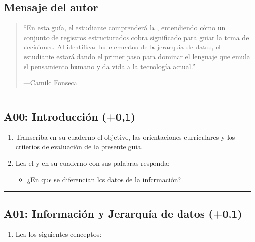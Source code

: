 \documentclass[letterpaper,10pt,spanish]{sphinxmanual}
\begin{document}
\subsection{Mensaje del autor}
\label{\detokenize{1_guias/8logica/G822:mensaje-del-autor}}\begin{quote}

\sphinxAtStartPar
“En esta guía, el estudiante comprenderá la , entendiendo cómo un conjunto de registros estructurados cobra significado para guiar la toma de decisiones. Al identificar los elementos de la jerarquía de datos, el estudiante estará dando el primer paso para dominar el lenguaje que emula el pensamiento humano y da vida a la tecnología actual.”

\begin{flushright}
---Camilo Fonseca
\end{flushright}
\end{quote}


\bigskip\hrule\bigskip



\subsection{A00: Introducción (+0,1)}
\label{\detokenize{1_guias/8logica/G822:a00-introduccion-0-1}}
\sphinxAtStartPar
{}
\begin{enumerate}
%
\item {} 
\sphinxAtStartPar
Transcriba en su cuaderno el objetivo, las orientaciones curriculares y los criterios de evaluación de la presente guía.

\item {} 
\sphinxAtStartPar
Lea el  y en su cuaderno con sus palabras responda:
\begin{itemize}
\item {} 
\sphinxAtStartPar
¿En que se diferencian los datos de la información?

\end{itemize}

\end{enumerate}


\bigskip\hrule\bigskip



\subsection{A01: Información y Jerarquía de datos (+0,1)}
\label{\detokenize{1_guias/8logica/G822:a01-informacion-y-jerarquia-de-datos-0-1}}
\sphinxAtStartPar
{}
\begin{enumerate}
%
\item {} 
\sphinxAtStartPar
Lea los siguientes conceptos:

\end{enumerate}
\end{document}
